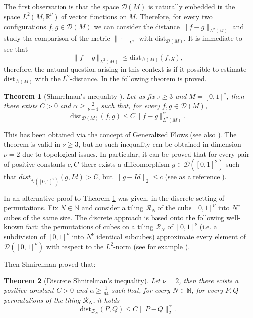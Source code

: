 \documentclass[12 pt]{article}
\theoremstyle{definition} \newtheorem{definition}{Definition}[section]
\theoremstyle{definition} \newtheorem{remark}[definition]{Remark}
\theoremstyle{plain} \newtheorem{lemma}[definition]{Lemma}
\theoremstyle{plain} \newtheorem{proposition}[definition]{Proposition}
\theoremstyle{plain} \newtheorem{theorem}[definition]{Theorem}
\theoremstyle{plain} \newtheorem{corollary}[definition]{Corollary}
\theoremstyle{definition} \newtheorem{example}[definition]{Example}
\theoremstyle{definition} \newtheorem{assumption}[definition]{Assumption}
\theoremstyle{definition} \newtheorem{conjecture}[definition]{Conjecture}
\newcommand{\R}{\mathbb{R}}
\newcommand{\N}{\mathbb{N}}
\newcommand{\1}{\mathbbm 1}
\numberwithin{equation}{section}
\begin{document}
The first observation is that the space $\mathcal{D}(M)$ is naturally embedded in the space $L^2(M,\R^\nu)$ of vector functions on $M$. Therefore, for every two configurations $f,g\in\mathcal{D}(M)$ we can consider the distance $\|f-g\|_{L^2(M)}$ and study the comparison of the metric $\|\cdot\|_{L^2}$ with $\text{dist}_{\mathcal{D}(M)}$. It is immediate to see that
\begin{equation*}
    \|f-g\|_{L^2(M)}\leq \text{dist}_{\mathcal{D}(M)}(f,g),
\end{equation*}
therefore, the natural question arising in this context is if it possible to estimate $\text{dist}_{\mathcal{D}(M)}$ with the $L^2$-distance.
In \cite{Shnirelman2} the following theorem is proved.
\begin{theorem}[Shnirelman's inequality \cite{Shnirelman2}]\label{thm:shnirelman}
    Let us fix $\nu\geq 3$ and $M=[0,1]^\nu$, then there exists $C>0$ and $\alpha\geq \frac{2}{\nu+4}$ such that, for every $f,g\in\mathcal{D}(M)$,
    \begin{equation}\label{eq:ineq:shnirelman}
        \text{dist}_{\mathcal{D}(M)}(f,g)\leq C\|f-g\|_{L^2(M)}^\alpha.
    \end{equation}
\end{theorem}
This has been obtained via the concept of Generalized Flows (see also \cite{Brenier1}). The theorem is valid in $\nu\geq 3$, but no such inequality can be obtained in dimension $\nu=2$ due to topological issues. In particular, it can be proved that for every pair of positive constants $c, C $ there exists a diffeomorphism $g \in\mathcal D([0,1]^2)$ such that
$dist_{\mathcal D([0,1]^2)}(g,Id) > C$, but $\|g-Id\|_2\leq c$ (see as a reference \cite{Arnold:khesin}).
\medskip 

In \cite{Shnirelman} an alternative proof to Theorem \ref{thm:shnirelman} was given, in the discrete setting of permutations. Fix $N\in \N$ and consider a tiling $\mathcal{R}_N$ of the cube $[0,1]^\nu$ into $N^\nu$ cubes of the same size. The discrete approach is based onto the following well-known fact: the permutations of cubes on a tiling $\mathcal{R}_N$ of $[0,1]^\nu$ (i.e. a subdivision of $[0,1]^\nu$ into $N^\nu$ identical subcubes) approximate every element of $\mathcal{D}([0,1]^\nu)$ with respect to the $L^2$-norm (see for example \cite{Lax}).




Then Shnirelman proved that:

\begin{theorem}[Discrete Shnirelman's inequality]
    Let $\nu=2$, then there exists a positive constant $C>0$ and $\alpha\geq\frac{1}{64}$ such that, for every $N\in\N$, for every $P,Q$ permutations of the tiling $\mathcal{R}_N$, it holds
    \begin{equation}
        \text{dist}_{\mathcal{D}_N}(P,Q)\leq C\|P-Q\|_2^\alpha.
    \end{equation}
\end{theorem}
\end{document}
